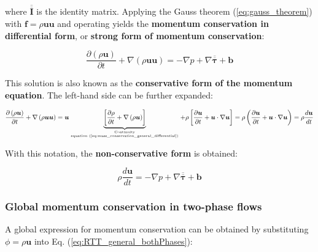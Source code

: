 where $\overline{\overline{\pmb{I}}}$ is the identity matrix. Applying the Gauss theorem (\ref{eq:gauss_theorem}) with $\boldsymbol{f} = \rho \boldsymbol{u} \boldsymbol{u}$ and operating yields the \textbf{momentum conservation in differential form}, or \textbf{strong form of momentum conservation}:

\begin{equation}
\label{eq:momentum_conservation_general_differential}
\boxed{
\frac{\partial \left( \rho \boldsymbol{u} \right) }{\partial t}  + \nabla \left( \rho \boldsymbol{u}  \boldsymbol{u} \right) =  - \nabla p + \nabla \overline{\overline{\pmb{\tau}}} + \boldsymbol{b} 
}
\end{equation}

This solution is also known as the \textbf{conservative form of the momentum equation}. The left-hand side can be further expanded:

\begin{equation}
\frac{\partial \left( \rho \boldsymbol{u} \right) }{\partial t}  + \nabla \left( \rho \boldsymbol{u}  \boldsymbol{u} \right) =  \boldsymbol{u} \underbrace{ \left[ \frac{\partial \rho}{\partial t} +  \nabla \left( \rho \boldsymbol{u} \right) \right]}_{\text{Continuity}\atop\text{equation (\ref{eq:mass_conservation_general_differential})}}  + \rho \left[ \frac{\partial \boldsymbol{u}}{\partial t} +  \boldsymbol{u} \cdot \nabla \boldsymbol{u} \right] = \rho \left( \frac{\partial \boldsymbol{u}}{\partial t} +  \boldsymbol{u} \cdot \nabla \boldsymbol{u} \right) = \rho \frac{d \boldsymbol{u}}{dt}
\end{equation}


With this notation, the \textbf{non-conservative form} is obtained:

\begin{equation}
\rho \frac{d \boldsymbol{u}}{dt} =  - \nabla p + \nabla \overline{\overline{\pmb{\tau}}} +  \boldsymbol{b} 
\end{equation}


\subsubsection*{Global momentum conservation in two-phase flows}

A global expression for momentum conservation can be obtained by substituting $\phi = \rho \boldsymbol{u}$ into Eq. (\ref{eq:RTT_general_bothPhases}):

